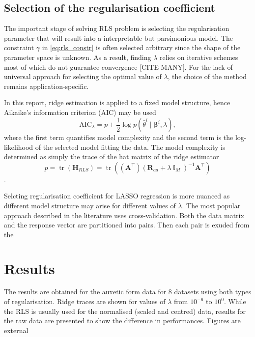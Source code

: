 \documentclass[a4paper,11pt,twoside]{article}
\DeclareMathOperator{\eye}{\mathbb{I}}
\DeclareMathOperator{\tr}{\textrm{tr}}
\theoremstyle{mytheoremstyle}
\begin{document}
\subsection{Selection of the regularisation coefficient}
\par The important stage of solving RLS problem is selecting the regularisation parameter that will result into a interpretable but parsimonious model. The constraint $\gamma$ in \eqref{eq:rls_constr} is often selected arbitrary since the shape of the parameter space is unknown. As a result, finding $\lambda$ relies on iterative schemes most of which do not guarantee convergence [CITE MANY]. For the lack of universal approach for selecting the optimal value of $\lambda$, the choice of the method remains application-specific.
\par In this report, ridge estimation is applied to a fixed model structure, hence Aikaike’s information criterion (AIC) may be used
\begin{equation}
\text{AIC}_{\lambda} = p + \frac{1}{2}\log p(\bar{\theta}^i \mid \mathbf{\beta}^i, \lambda),
\end{equation}
where the first term quantifies model complexity and the second term is the log-likelihood of the selected model fitting the data. The model complexity is determined as simply the trace of the hat matrix of the ridge estimator
\begin{equation}
p = \tr(\mathbf{H}_{RLS}) = \tr((\mathbf{A}^{\top})(\mathbf{R}_{aa} + \lambda \eye_M)^{-1} \mathbf{A}^{\top})
\end{equation}.
\par Selcting regularisation coefficient for LASSO regression is more nuanced as different model structure may arise for different values of $\lambda$. The most popular approach described in the literature uses cross-validation. Both the data matrix and the response vector are partitioned into pairs. Then each pair is exuded from the 
\section{Results}
\par The results are obtained for the auxetic form data for 8 datasets using both types of regularisation. Ridge traces are shown for values of $\lambda$ from $10^{-6}$ to $10^0$. While the RLS is usually used for the normalised (scaled and centred) data, results for the raw data are presented to show the difference in performances.  
Figures are external 
\end{document}
